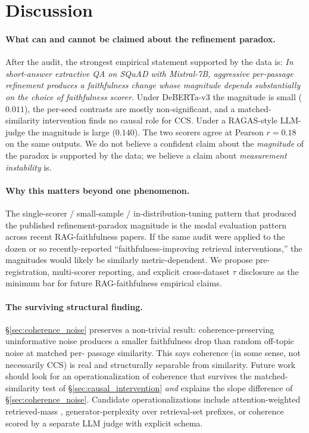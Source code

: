 \section{Discussion}
\label{sec:discussion}

\paragraph{What can and cannot be claimed about the refinement paradox.}
After the audit, the strongest empirical statement supported by
the data is: \emph{In short-answer extractive QA on SQuAD with
Mistral-7B, aggressive per-passage refinement produces a
faithfulness change whose magnitude depends substantially on the
choice of faithfulness scorer.} Under DeBERTa-v3 the magnitude is
small ($0.011$), the per-seed contrasts are mostly non-significant,
and a matched-similarity intervention finds no causal role for CCS.
Under a RAGAS-style LLM-judge the magnitude is large ($0.140$).
The two scorers agree at Pearson $r = 0.18$ on the same outputs.
We do not believe a confident claim about the
\emph{magnitude} of the paradox is supported by the data;
we believe a claim about \emph{measurement instability} is.

\paragraph{Why this matters beyond one phenomenon.}
The single-scorer / small-sample / in-distribution-tuning pattern
that produced the published refinement-paradox magnitude is the
modal evaluation pattern across recent RAG-faithfulness papers.
If the same audit were applied to the dozen or so recently-reported
``faithfulness-improving retrieval interventions,'' the magnitudes
would likely be similarly metric-dependent. We propose
pre-registration, multi-scorer reporting, and explicit
cross-dataset $\tau$ disclosure as the minimum bar for future
RAG-faithfulness empirical claims.

\paragraph{The surviving structural finding.}
\S\ref{sec:coherence_noise} preserves a non-trivial result:
coherence-preserving uninformative noise produces a smaller
faithfulness drop than random off-topic noise at matched per-
passage similarity. This says coherence (in some sense, not
necessarily CCS) is real and structurally separable from
similarity. Future work should look for an
operationalization of coherence that survives the matched-similarity
test of \S\ref{sec:causal_intervention} \emph{and} explains the
slope difference of \S\ref{sec:coherence_noise}. Candidate
operationalizations include attention-weighted retrieved-mass
\citep{geva2023attention}, generator-perplexity over retrieval-set
prefixes, or coherence scored by a separate LLM judge with explicit
schema.

